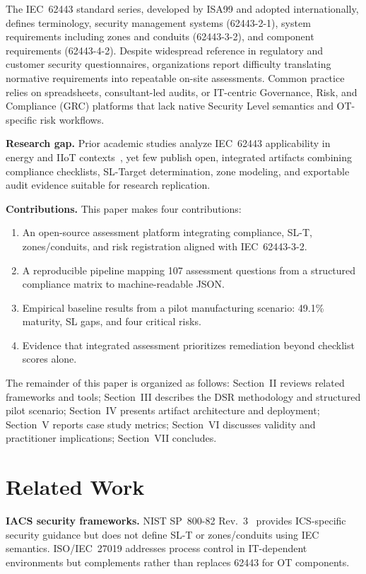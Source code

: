 \documentclass[10pt,conference]{IEEEtran}
\begin{document}
The IEC~62443 standard series, developed by ISA99 and adopted internationally, defines terminology, security management systems (62443-2-1), system requirements including zones and conduits (62443-3-2), and component requirements (62443-4-2). Despite widespread reference in regulatory and customer security questionnaires, organizations report difficulty translating normative requirements into repeatable on-site assessments. Common practice relies on spreadsheets, consultant-led audits, or IT-centric Governance, Risk, and Compliance (GRC) platforms that lack native Security Level semantics and OT-specific risk workflows.

\textbf{Research gap.} Prior academic studies analyze IEC~62443 applicability in energy and IIoT contexts~\cite{vtt2018industrial}, yet few publish open, integrated artifacts combining compliance checklists, SL-Target determination, zone modeling, and exportable audit evidence suitable for research replication.

\textbf{Contributions.} This paper makes four contributions:
\begin{enumerate}
    \item An open-source assessment platform integrating compliance, SL-T, zones/conduits, and risk registration aligned with IEC~62443-3-2.
    \item A reproducible pipeline mapping 107 assessment questions from a structured compliance matrix to machine-readable JSON.
    \item Empirical baseline results from a pilot manufacturing scenario: 49.1\% maturity, SL gaps, and four critical risks.
    \item Evidence that integrated assessment prioritizes remediation beyond checklist scores alone.
\end{enumerate}

The remainder of this paper is organized as follows: Section~II reviews related frameworks and tools; Section~III describes the DSR methodology and structured pilot scenario; Section~IV presents artifact architecture and deployment; Section~V reports case study metrics; Section~VI discusses validity and practitioner implications; Section~VII concludes.

\section{Related Work}
\textbf{IACS security frameworks.} NIST SP~800-82 Rev.~3~\cite{stouffer2023nist825} provides ICS-specific security guidance but does not define SL-T or zones/conduits using IEC semantics. ISO/IEC~27019 addresses process control in IT-dependent environments but complements rather than replaces 62443 for OT components.
\end{document}
